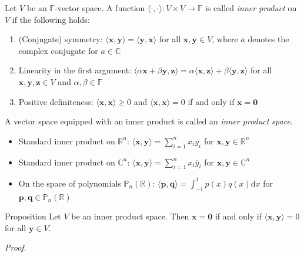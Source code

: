 \documentclass [aspectratio=169]{beamer}
\newcommand{\bx}{{\mathbf{x}}}
\newcommand{\by}{{\mathbf{y}}}
\newcommand{\bz}{{\mathbf{z}}}
\newcommand{\zerovec}{{\mathbf{0}}}
\newcommand{\innerprod}[1]{\langle #1 \rangle}
\newcommand{\R}{{\mathbb{R}}}
\newcommand{\C}{{\mathbb{C}}}
\newcommand{\F}{{\mathbb{F}}}
\begin{document}
\begin{frame}
\begin{definition}
Let $V$ be an $\F$-vector space. A function $\innerprod{\cdot,\cdot} \colon V \times V \to \F$ is called \emph{inner product} on $V$ if the following holds:
\begin{enumerate}
\setlength\itemsep{0.5em}
    \item (Conjugate) symmetry: $\innerprod{\bx,\by} = \overline{\innerprod{\by,\bx}}$ for all $\bx,\by\in V$, where $\overline{a}$ denotes the complex conjugate for $a\in \C$
    \item Linearity in the first argument: $\innerprod{\alpha \bx + \beta \by, \bz} = \alpha \innerprod{\bx,\bz} + \beta \innerprod{\by,\bz}$ for all $\bx,\by,\bz\in V$ and $\alpha, \beta \in \F$
    \item Positive definiteness: $\innerprod{\bx,\bx} \geq 0$ and $\innerprod{\bx,\bx} = 0$ if and only if $\bx = \zerovec$ 
\end{enumerate}
\vspace{1em}
A vector space equipped with an inner product is called an \emph{inner product space}.
\end{definition}

\end{frame}


\begin{frame}
\begin{example}
\begin{itemize}
      \setlength\itemsep{1.5em}
    \item Standard inner product on $\R^n$: $\innerprod{\bx,\by }= \sum_{i=1}^n x_iy_i$ for $\bx,\by\in \R^n$
    \item Standard inner product on $\C^n$: $\innerprod{\bx,\by }= \sum_{i=1}^n x_i\overline{y}_i$ for $\bx,\by\in \C^n$
    \item On the space of polynomials $\mathbb{P}_n(\R)$: $\innerprod{\boldsymbol{p},\boldsymbol{q}} = \int_{-1}^1 p(x) {q}(x) \mathrm{d}x$ for $\boldsymbol{p},\boldsymbol{q}\in \mathbb{P}_n(\R)$
\end{itemize}
\end{example}

\end{frame}


\begin{frame}
\begin{exampleblock}{Proposition}
Let $V$ be an inner product space. Then $\bx = \zerovec$ if and only if $\innerprod{\bx,\by } = 0$ for all $\by \in V$.
\end{exampleblock}

\textit{Proof}.
\vspace{4.5cm}

\end{frame}
\end{document}
